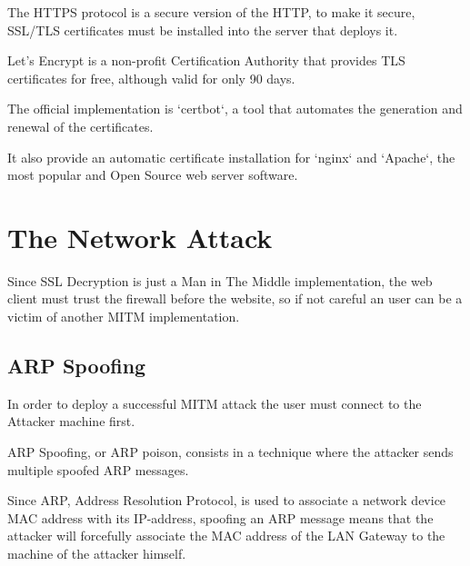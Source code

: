 The HTTPS protocol is a secure version of the HTTP, to make it secure, SSL/TLS certificates must be installed into the server that deploys it.

Let's Encrypt is a non-profit Certification Authority that provides TLS certificates for free, although valid for only 90 days.

The official implementation is `certbot`, a tool that automates the generation and renewal of the certificates.

It also provide an automatic certificate installation for `nginx` and `Apache`, the most popular and Open Source web server software.

\section{The Network Attack}

Since SSL Decryption is just a Man in The Middle implementation, the web client must trust the firewall before the website, so if not careful an user can be a victim of another MITM implementation.

\newpage

\subsection{ARP Spoofing}

In order to deploy a successful MITM attack the user must connect to the Attacker machine first.

ARP Spoofing, or ARP poison, consists in a technique where the attacker sends multiple spoofed ARP messages.

Since ARP, Address Resolution Protocol, is used to associate a network device MAC address with its IP-address, spoofing an ARP message means that the attacker will forcefully associate the MAC address of the LAN Gateway to the machine of the attacker himself.

